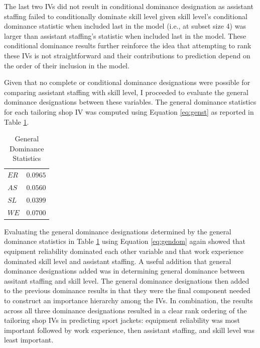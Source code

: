 \documentclass[man]{apa7}
\begin{document}
	The last two IVs did not result in conditional dominance designation as assistant staffing failed to conditionally dominate skill level given skill level's conditional dominance statistic when included last in the model (i.e., at subset size 4) was larger than assistant staffing's statistic when included last in the model.
	These conditional dominance results further reinforce the idea that attempting to rank these IVs is not straightforward and their contributions to prediction depend on the order of their inclusion in the model. 
	
	Given that no complete or conditional dominance designations were possible for comparing assistant staffing with skill level, I proceeded to evaluate the general dominance designations between these variables. 
	The general dominance statistics for each tailoring shop IV was computed using Equation \ref{eq:genst} as reported in Table \ref{tab:gen}.
	
	\begin{table}[h!]
		\centering
		\caption{\centering General Dominance Statistics}
		\begin{tabular}{l|r}
			\hline 
			$ER$ & $0.0965$ \\ 
			$AS$ & $0.0560$ \\ 
			$SL$ & $0.0399$ \\ 
			$WE$ & $0.0700$ \\ 
			\hline 
		\end{tabular}
		\label{tab:gen}
	\end{table}

	Evaluating the general dominance designations determined by the general dominance statistics in Table \ref{tab:gen} using Equation \ref{eq:gendom} again showed that equipment reliability dominated each other variable and that work experience dominated skill level and assistant staffing. 
	A useful addition that general dominance designations added was in determining general dominance between assitant staffing and skill level.
	The general dominance designations then added to the previous dominance results in that they were the final component needed to construct an importance hierarchy among the IVs.
	In combination, the results across all three dominance designations resulted in a clear rank ordering of the tailoring shop IVs in predicting sport jackets: equipment reliability was most important followed by work experience, then assistant staffing, and skill level was least important.
	
\end{document}

